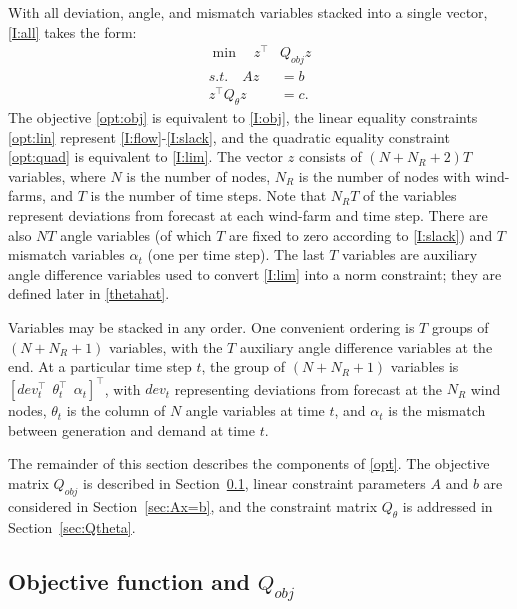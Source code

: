 \documentclass[conference]{IEEEtran}
\begin{document}
With all deviation, angle, and mismatch variables stacked into a single vector, \eqref{I:all} takes the form:
\begin{subequations}\label{opt}
\begin{align}
\label{opt:obj} \min\quad z^\top &Q_{obj} z \\
\label{opt:lin}  s.t.\quad Az &= b  \\
\label{opt:quad}  z^\top Q_{\theta}z &= c.
\end{align}
\end{subequations}
The objective \eqref{opt:obj} is equivalent to \eqref{I:obj}, the
linear equality constraints \eqref{opt:lin} represent
\eqref{I:flow}-\eqref{I:slack}, and the quadratic equality constraint
\eqref{opt:quad} is equivalent to \eqref{I:lim}. The vector $z$
consists of $(N+N_R+2)T$ variables, where $N$ is the number of nodes,
$N_R$ is the number of nodes with wind-farms, and $T$ is the number of
time steps. Note that $N_RT$ of the variables represent deviations
from forecast at each wind-farm and time step. There are also $NT$
angle variables (of which $T$ are fixed to zero according to
\eqref{I:slack}) and $T$ mismatch variables $\alpha_t$ (one per time
step). The last $T$ variables are auxiliary angle difference variables
used to convert \eqref{I:lim} into a norm constraint; they are defined
later in \eqref{thetahat}.

Variables may be stacked in any order. One convenient ordering is $T$
groups of $(N+N_R+1)$ variables, with the $T$ auxiliary angle
difference variables at the end. At a particular time step $t$, the
group of $(N+N_R+1)$ variables is $[dev_t^\top ~~ \theta_t^\top ~~
  \alpha_t ]^\top$, with $dev_t$ representing deviations from forecast
at the $N_R$ wind nodes, $\theta_t$ is the column of $N$ angle
variables at time $t$, and $\alpha_t$ is the mismatch between
generation and demand at time $t$.

The remainder of this section describes the components of
\eqref{opt}. The objective matrix $Q_{obj}$ is described in
Section~\ref{sec:Qobj}, linear constraint parameters $A$ and $b$ are
considered in Section~\ref{sec:Ax=b}, and the constraint matrix
$Q_{\theta}$ is addressed in Section~\ref{sec:Qtheta}.

\subsection{Objective function and $Q_{obj}$}\label{sec:Qobj}
\end{document}
